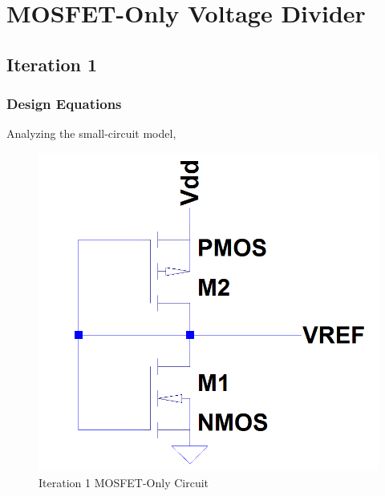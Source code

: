\documentclass[conference]{IEEEtran}
\begin{document}
\section{MOSFET-Only Voltage Divider}
\subsection{Iteration 1}
\subsubsection{Design Equations}
Analyzing the small-circuit model, 

\begin{figure}[htb]
  \centering
  \includegraphics[scale=0.25]{images/mosfet-only1.png}
  \caption[mosfet-only1]{Iteration 1 MOSFET-Only Circuit}
  \label{fig:mosfet-only1}
\end{figure}
\end{document}

